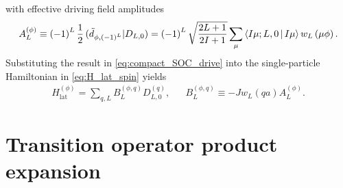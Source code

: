 \documentclass[nofootinbib,notitlepage,11pt]{revtex4-2}
\renewcommand{\t}{\text} %
\newcommand{\f}[2]{\dfrac{#1}{#2}} %
\newcommand{\p}[1]{\left(#1\right)} %
\newcommand{\bk}{\Braket} %
\newcommand{\1}{\mathds{1}}
\def\obk#1{\mathinner{({#1})}}
\begin{document}
with effective driving field amplitudes
\begin{align}
  A_L^{(\phi)}
  \equiv \p{-1}^L \f12 \obk{\tilde d_{\phi,\p{-1}^L}|D_{L,0}}
  = \p{-1}^L \sqrt{\f{2L+1}{2I+1}}
  \sum_\mu \bk{I\mu;L,0|I\mu} w_L\p{\mu\phi}.
\end{align}
Substituting the result in \eqref{eq:compact_SOC_drive} into the
single-particle Hamiltonian in \eqref{eq:H_lat_spin} yields
\begin{align}
  H_{\t{lat}}^{(\phi)} = \sum_{q,L} B_L^{(\phi,q)} D_{L,0}^{(q)},
  &&
  B_L^{(\phi,q)} \equiv -J w_L\p{qa} A_L^{(\phi)}.
\end{align}

\section{Transition operator product expansion}
\label{sec:trans_prod}
\end{document}
